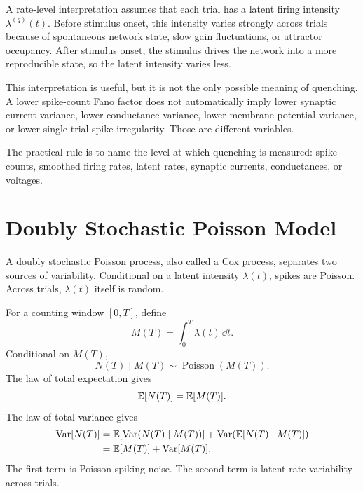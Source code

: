 A rate-level interpretation assumes that each trial has a latent firing intensity $\lambda^{(q)}(t)$. Before stimulus onset, this intensity varies strongly across trials because of spontaneous network state, slow gain fluctuations, or attractor occupancy. After stimulus onset, the stimulus drives the network into a more reproducible state, so the latent intensity varies less.

This interpretation is useful, but it is not the only possible meaning of quenching. A lower spike-count Fano factor does not automatically imply lower synaptic current variance, lower conductance variance, lower membrane-potential variance, or lower single-trial spike irregularity. Those are different variables.

The practical rule is to name the level at which quenching is measured: spike counts, smoothed firing rates, latent rates, synaptic currents, conductances, or voltages.

\section{Doubly Stochastic Poisson Model}
\label{sec:doubly-stochastic-poisson-model}

A doubly stochastic Poisson process, also called a Cox process, separates two sources of variability. Conditional on a latent intensity $\lambda(t)$, spikes are Poisson. Across trials, $\lambda(t)$ itself is random.

For a counting window $[0,T]$, define
%
\begin{equation}
  M(T)
  =
  \int_0^T \lambda(t)\,\dd t.
  \label{eq:cox-conditional-mean}
\end{equation}
%
Conditional on $M(T)$,
%
\begin{equation}
  N(T)\mid M(T)
  \sim
  \operatorname{Poisson}(M(T)).
  \label{eq:cox-conditional-poisson}
\end{equation}
%
The law of total expectation gives
%
\begin{equation}
  \mathbb{E}[N(T)]
  =
  \mathbb{E}[M(T)].
  \label{eq:cox-total-mean}
\end{equation}
%
The law of total variance gives
%
\begin{align}
  \operatorname{Var}[N(T)]
  &=
  \mathbb{E}[\operatorname{Var}(N(T)\mid M(T))]
  +
  \operatorname{Var}(\mathbb{E}[N(T)\mid M(T)])
  \nonumber\\
  &=
  \mathbb{E}[M(T)]
  +
  \operatorname{Var}[M(T)].
  \label{eq:cox-total-variance}
\end{align}
%
The first term is Poisson spiking noise. The second term is latent rate variability across trials.

